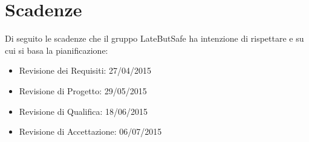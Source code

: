 \section{Scadenze}

Di seguito le scadenze che il gruppo LateButSafe ha intenzione di rispettare e su cui si basa la pianificazione:

\begin{itemize}

\item Revisione dei Requisiti: 27/04/2015
\item Revisione di Progetto: 29/05/2015
\item Revisione di Qualifica: 18/06/2015
\item Revisione di Accettazione: 06/07/2015

\end{itemize}
